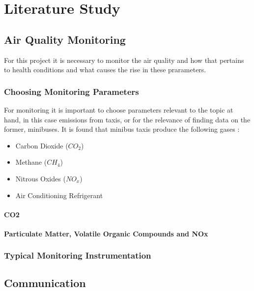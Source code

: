\chapter{Literature Study}

\section{Air Quality Monitoring}
For this project it is necessary to monitor the air quality and how that pertains to health conditions and what causes the rise in these prarameters.
\subsection{Choosing Monitoring Parameters}
For monitoring it is important to choose parameters relevant to the topic at hand, in this case emissions from taxis, or for the relevance of finding data on the former, minibuses. It is found that minibus taxis produce the following gases\cite{gasfromvehicles} :

\begin{itemize}
	\item Carbon Dioxide ($CO_2$)
	\item Methane ($CH_4$)
	\item Nitrous Oxides ($NO_x$)
	\item Air Conditioning Refrigerant
\end{itemize}


\subsubsection{CO2}

\subsubsection{Particulate Matter, Volatile Organic Compounds and NOx}

\subsection{Typical Monitoring Instrumentation}


\section{Communication}

\section{}
